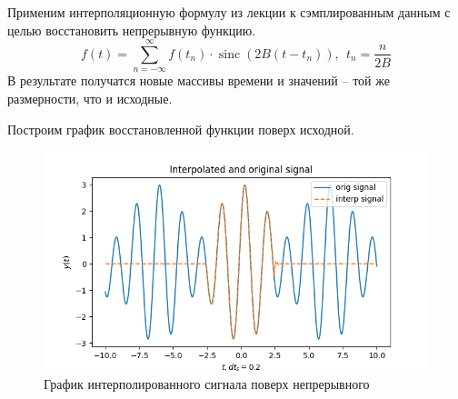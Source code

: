 \documentclass[a4paper, 12pt]{article}
\DeclareMathOperator{\sinc}{sinc}
\begin{document}
    Применим интерполяционную формулу из лекции к сэмплированным
    данным с целью восстановить непрерывную функцию.
    $$
    f(t)=\sum\limits_{n=-\infty}^{\infty}f(t_n)\cdot\sinc{(2B(t-t_n))},\ \ t_n=\dfrac{n}{2B}
    $$
    В результате получатся новые массивы времени и значений -- той же размерности, что и исходные.


    Построим график восстановленной функции поверх исходной.
    \begin{figure}[H]
        \centering
        \includegraphics[scale=0.45]{1_isine.png}
        \captionsetup{skip=0pt}
        \caption{График интерполированного сигнала поверх непрерывного}
        \label{fig:1isine}
    \end{figure}
    
\end{document}
